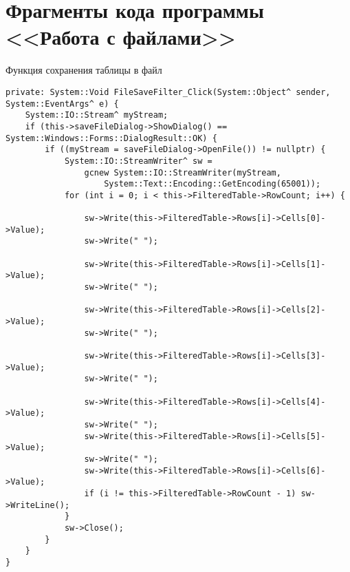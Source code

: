 \section{Фрагменты кода программы <<Работа с файлами>>}
\label{app:files}


Функция сохранения таблицы в файл
\begin{verbatim}
private: System::Void FileSaveFilter_Click(System::Object^ sender, System::EventArgs^ e) {
	System::IO::Stream^ myStream;
	if (this->saveFileDialog->ShowDialog() == System::Windows::Forms::DialogResult::OK) {
		if ((myStream = saveFileDialog->OpenFile()) != nullptr) {
			System::IO::StreamWriter^ sw =
				gcnew System::IO::StreamWriter(myStream,
					System::Text::Encoding::GetEncoding(65001));
			for (int i = 0; i < this->FilteredTable->RowCount; i++) {

				sw->Write(this->FilteredTable->Rows[i]->Cells[0]->Value);
				sw->Write(" ");

				sw->Write(this->FilteredTable->Rows[i]->Cells[1]->Value);
				sw->Write(" ");

				sw->Write(this->FilteredTable->Rows[i]->Cells[2]->Value);
				sw->Write(" ");

				sw->Write(this->FilteredTable->Rows[i]->Cells[3]->Value);
				sw->Write(" ");

				sw->Write(this->FilteredTable->Rows[i]->Cells[4]->Value);
				sw->Write(" ");
				sw->Write(this->FilteredTable->Rows[i]->Cells[5]->Value);
				sw->Write(" ");
				sw->Write(this->FilteredTable->Rows[i]->Cells[6]->Value);
				if (i != this->FilteredTable->RowCount - 1)	sw->WriteLine();
			}
			sw->Close();
		}
	}
}
\end{verbatim}